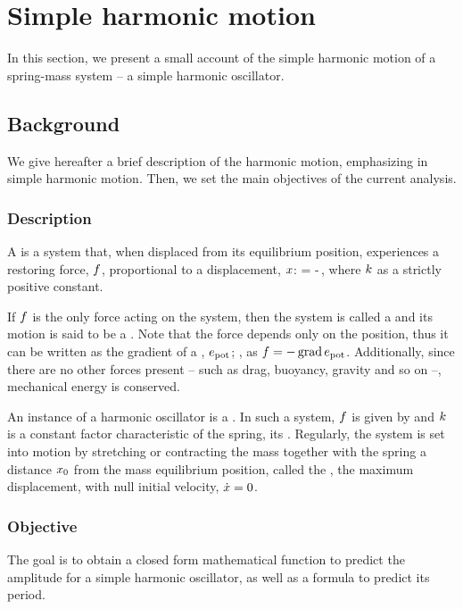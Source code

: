 \section{Simple harmonic motion}
In this section, we present a small account of the simple harmonic motion of a spring-mass system -- a simple harmonic oscillator.


\subsection{Background}
We give hereafter a brief description of the harmonic motion, emphasizing in simple harmonic motion. Then, we set the main objectives of the current analysis.


\subsubsection{Description}
A  is a system that, when displaced from its equilibrium position, experiences a restoring force, $f$, proportional to a displacement, $x$:
\beq
\force = -\kspring\disp\,,
\eeq
where $k$ as a strictly positive constant.

If $f$ is the only force acting on the system, then the system is called a  and its motion is said to be a . Note that the force depends only on the position, thus it can be written as the gradient of a , $e_\text{pot}$; \ie, as $f = -\operatorname{grad}e_\text{pot}$. Additionally, since there are no other forces present -- such as drag, buoyancy, gravity and so on --, mechanical energy is conserved.

An instance of a harmonic oscillator is a . In such a system, $f$ is given by  and $k$ is a constant factor characteristic of the spring, its . Regularly, the system is set into motion by stretching or contracting the mass together with the spring a distance $x_0$ from the mass equilibrium position, called the , the maximum displacement, with null initial velocity, $\dot{x} = 0$.


\subsubsection{Objective}
The goal is to obtain a closed form mathematical function to predict the amplitude for a simple harmonic oscillator, as well as a formula to predict its period.


